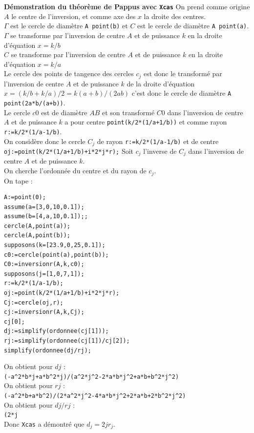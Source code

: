 \documentclass[a4paper,11pt]{book}
\begin{document}
{\bf D\'emonstration du th\'eor\`eme de Pappus avec {\tt Xcas}}
On prend comme origine $A$ le centre de l'inversion, et comme axe des $x$ la 
droite  des centres.\\
$\Gamma$ est le cercle de diam\`etre {\tt A point(b)} et $C$ est le cercle de 
diam\`etre {\tt A point(a)}.\\
$\Gamma$ se transforme par l'inversion de centre $A$ et de puissance $k$ en la 
droite d'\'equation $x=k/b$\\
$C$ se transforme par l'inversion de centre $A$ et de puissance $k$ en la 
droite d'\'equation $x=k/a$\\
Le cercle des points de tangence des cercles $c_j$ est donc le transform\'e par
l'inversion de centre $A$ et de puissance $k$ de la droite d'\'equation 
$x=(k/b+k/a)/2=k(a+b)/(2ab)$ c'est donc le cercle de diam\`etre 
{\tt A point(2a*b/(a+b))}.\\
Le cercle $c0$ est de diam\`etre $AB$ et son transform\'e $C0$
dans l'inversion de centre $A$ et de puissance $k$ a pour centre
{\tt point(k/2*(1/a+1/b))} et comme rayon {\tt r:=k/2*(1/a-1/b)}.\\
On consid\`ere donc le  cercle $C_j$ de rayon 
{\tt r:=k/2*(1/a-1/b)} et de centre {\tt oj:=point(k/2*(1/a+1/b)+i*2*j*r);} 
Soit $c_j$ l'inverse de $C_j$ dans 
l'inversion de centre $A$ et de puissance $k$.\\
On cherche l'ordonn\'ee du centre et du rayon de $c_j$.\\
On tape :
\begin{verbatim}
A:=point(0);
assume(a=[3,0,10,0.1]);
assume(b=[4,a,10,0.1]);;
cercle(A,point(a));
cercle(A,point(b));
supposons(k=[23.9,0,25,0.1]);
c0:=cercle(point(a),point(b));
C0:=inversionr(A,k,c0);
supposons(j=[1,0,7,1]);
r:=k/2*(1/a-1/b);
oj:=point(k/2*(1/a+1/b)+i*2*j*r);
Cj:=cercle(oj,r);
cj:=inversionr(A,k,Cj);
cj[0];
dj:=simplify(ordonnee(cj[1]));
rj:=simplify(ordonnee(cj[1])/cj[2]);
simplify(ordonnee(dj/rj);
\end{verbatim}
On obtient pour $dj$ :\\
{\tt (-a\verb|^|2*b*j+a*b\verb|^|2*j)/(a\verb|^|2*j\verb|^|2-2*a*b*j\verb|^|2+a*b+b\verb|^|2*j\verb|^|2)}\\
On obtient pour $rj$ :\\
{\tt(-a\verb|^|2*b+a*b\verb|^|2)/(2*a\verb|^|2*j\verb|^|2-4*a*b*j\verb|^|2+2*a*b+2*b\verb|^|2*j\verb|^|2)}\\
On obtient pour $dj/rj$ :\\
{\tt (2*j}\\
Donc {\tt Xcas} a d\'emontr\'e que $d_j=2jr_j$.
\end{document}
